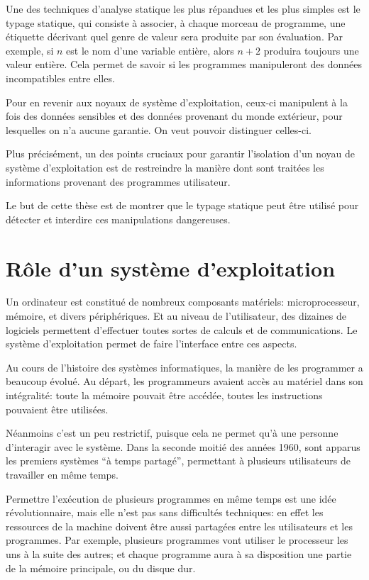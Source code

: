 Une des techniques d'analyse statique les plus répandues et les plus simples est
le typage statique, qui consiste à associer, à chaque morceau de programme, une
étiquette décrivant quel genre de valeur sera produite par son évaluation. Par
exemple, si $n$ est le nom d'une variable entière, alors $n + 2$ produira
toujours une valeur entière.
Cela permet de savoir si les programmes manipuleront des données incompatibles
entre elles.

Pour en revenir aux noyaux de système d'exploitation, ceux-ci manipulent à la
fois des données sensibles et des données provenant du monde extérieur, pour
lesquelles on n'a aucune garantie. On veut pouvoir distinguer celles-ci.

Plus précisément, un des points cruciaux pour garantir l'isolation d'un noyau de
système d'exploitation est de restreindre la manière dont sont traitées les
informations provenant des programmes utilisateur.

Le but de cette thèse est de montrer que le typage statique peut être utilisé
pour détecter et interdire ces manipulations dangereuses.

\section{Rôle d'un système d'exploitation}

Un ordinateur est constitué de nombreux composants matériels: microprocesseur,
mémoire, et divers périphériques. Et au niveau de l'utilisateur, des dizaines de
logiciels permettent d'effectuer toutes sortes de calculs et de communications.
Le système d'exploitation permet de faire l'interface entre ces aspects.

Au cours de l'histoire des systèmes informatiques, la manière de les programmer
a beaucoup évolué. Au départ, les programmeurs avaient accès au matériel dans
son intégralité: toute la mémoire pouvait être accédée, toutes les instructions
pouvaient être utilisées.

Néanmoins c'est un peu restrictif, puisque cela ne permet qu'à une personne
d'interagir avec le système. Dans la seconde moitié des années 1960, sont
apparus les premiers systèmes \enquote{à temps partagé}, permettant à plusieurs
utilisateurs de travailler en même temps.

Permettre l'exécution de plusieurs programmes en même temps est une idée
révolutionnaire, mais elle n'est pas sans difficultés techniques: en effet les
ressources de la machine doivent être aussi partagées entre les utilisateurs et
les programmes. Par exemple, plusieurs programmes vont utiliser le processeur
les uns à la suite des autres; et chaque programme aura à sa disposition une
partie de la mémoire principale, ou du disque dur.

